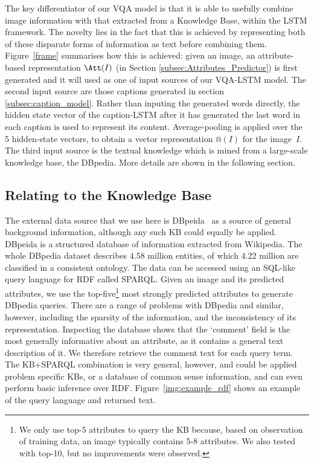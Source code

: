 The key differentiator of our VQA model is that it is able to usefully combine image information with that extracted from a Knowledge Base, within the LSTM framework. The novelty lies in the fact that this is achieved by representing both of these disparate forms of information as text before combining them. Figure~\ref{frame} summarises how this is achieved: given an image, an attribute-based  representation $\Att(I)$ (in Section \ref{subsec:Attributes_Predictor}) is first generated and it will used as one of input sources of our VQA-LSTM model. The second input source are those captions generated in section \ref{subsec:caption_model}. Rather than inputing the generated words directly, the hidden state vector of the caption-LSTM after it has generated the last word in each caption is used to represent its content. Average-pooling is applied over the 5 hidden-state vectors, to obtain a vector representation $\Cap(I)$ for the image~$I$. The third input source is the textual knowledge which is mined from a large-scale knowledge base, the DBpedia. More details are shown in the following section.

\subsection{Relating to the Knowledge Base}

The external data source that we use here is DBpeida~\cite{auer2007dbpedia} as a source of general background information, although any such KB could equally be applied. DBpeida is a structured database of information extracted from Wikipedia. The whole DBpedia dataset describes $4.58$ million entities, of which $4.22$ million are classified in a consistent ontology. The data can be accessed using an SQL-like query language for RDF called SPARQL. Given an image and its predicted attributes, we use the top-five\footnote{We only use top-5 attributes to query the KB because, based on observation of training data, an image typically contains 5-8 attributes. We also tested with top-10, but no improvements were observed.} most strongly predicted attributes to generate DBpedia queries. There are a range of problems with DBpedia and similar, however, including the sparsity of the information, and the inconsistency of its representation. Inspecting the database shows that the `comment' field is the most generally informative about an attribute, as it contains a general text description of it.  We therefore retrieve the comment text for each query term. The KB+SPARQL combination is very general, however, and could be applied problem specific KBs, or a database of common sense information, and can even perform basic inference over RDF. Figure~\ref{img:example_rdf} shows an example of the query language and returned text.

